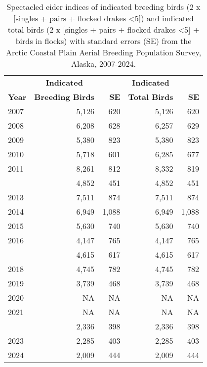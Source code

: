 \documentclass[
]{article}
\begin{document}
\begingroup\fontsize{10}{12}\selectfont

\begin{longtable}[t]{lrrrr}

\caption{\label{tbl-SPEI}Spectacled eider indices of indicated breeding
birds (2 x {[}singles + pairs + flocked drakes \textless5{]}) and
indicated total birds (2 x {[}singles + pairs + flocked drakes
\textless5{]} + birds in flocks) with standard errors (SE) from the
Arctic Coastal Plain Aerial Breeding Population Survey, Alaska,
2007-2024.}

\tabularnewline

\\
\toprule
\multicolumn{1}{c}{\textbf{ }} & \multicolumn{1}{c}{\textbf{Indicated}} & \multicolumn{1}{c}{\textbf{ }} & \multicolumn{1}{c}{\textbf{Indicated}} & \multicolumn{1}{c}{\textbf{ }} \\
\cmidrule(l{3pt}r{3pt}){2-2} \cmidrule(l{3pt}r{3pt}){4-4}
\textbf{Year} & \textbf{Breeding Birds} & \textbf{SE} & \textbf{Total Birds} & \textbf{SE}\\
\midrule
2007 & 5,126 & 620 & 5,126 & 620\\
2008 & 6,208 & 628 & 6,257 & 629\\
2009 & 5,380 & 823 & 5,380 & 823\\
2010 & 5,718 & 601 & 6,285 & 677\\
2011 & 8,261 & 812 & 8,332 & 819\\
\addlinespace
2012 & 4,852 & 451 & 4,852 & 451\\
2013 & 7,511 & 874 & 7,511 & 874\\
2014 & 6,949 & 1,088 & 6,949 & 1,088\\
2015 & 5,630 & 740 & 5,630 & 740\\
2016 & 4,147 & 765 & 4,147 & 765\\
\addlinespace
2017 & 4,615 & 617 & 4,615 & 617\\
2018 & 4,745 & 782 & 4,745 & 782\\
2019 & 3,739 & 468 & 3,739 & 468\\
2020 & NA & NA & NA & NA\\
2021 & NA & NA & NA & NA\\
\addlinespace
2022 & 2,336 & 398 & 2,336 & 398\\
2023 & 2,285 & 403 & 2,285 & 403\\
2024 & 2,009 & 444 & 2,009 & 444\\
\bottomrule

\end{longtable}
\end{document}
